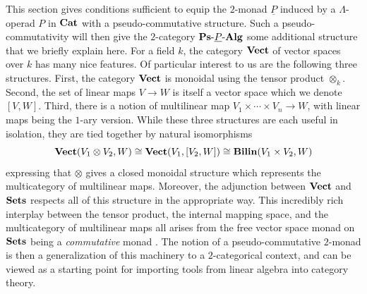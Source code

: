 This section gives conditions sufficient to equip the $2$-monad $\underline{P}$ induced by a $\Lambda$-operad $P$ in $\mathbf{Cat}$ with a pseudo-commutative structure. Such a pseudo-commutativity will then give the $2$-category $\mathbf{Ps}\mbox{-}\underline{P}\mbox{-}\mathbf{Alg}$ some additional structure that we briefly explain here. For a field $k$, the category $\mathbf{Vect}$ of vector spaces over $k$ has many nice features. Of particular interest to us are the following three structures. First, the category $\mathbf{Vect}$ is monoidal using the tensor product $\otimes_{k}$. Second, the set of linear maps $V \rightarrow W$ is itself a vector space which we denote $[V,W]$. Third, there is a notion of multilinear map $V_{1} \times \cdots \times V_{n} \rightarrow W$, with linear maps being the $1$-ary version. While these three structures are each useful in isolation, they are tied together by natural isomorphisms
  \[
    \mathbf{Vect}(V_{1} \otimes V_{2}, W) \cong \mathbf{Vect}(V_{1}, [V_{2}, W]) \cong \mathbf{Bilin}(V_{1} \times V_{2}, W)
  \]
expressing that $\otimes$ gives a closed monoidal structure which represents the multicategory of multilinear maps. Moreover, the adjunction between $\mathbf{Vect}$ and $\mathbf{Sets}$ respects all of this structure in the appropriate way. This incredibly rich interplay between the tensor product, the internal mapping space, and the multicategory of multilinear maps all arises from the free vector space monad on $\mathbf{Sets}$ being a \textit{commutative} monad \cite{kock-monads, kock-closed, kock-strong}. The notion of a pseudo-commutative $2$-monad \cite{HP} is then a generalization of this machinery to a $2$-categorical context, and can be viewed as a starting point for importing tools from linear algebra into category theory.

